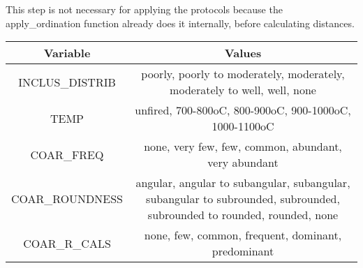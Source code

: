 \documentclass[12pt,]{book}
\begin{document}
This step is not necessary for applying the protocols because the apply\_ordination function already does it internally, before calculating distances.

\begin{longtable}[]{@{}cc@{}}
\toprule
\begin{minipage}[b]{0.22\columnwidth}\centering
Variable\strut
\end{minipage} & \begin{minipage}[b]{0.43\columnwidth}\centering
Values\strut
\end{minipage}\tabularnewline
\midrule
\endhead
\begin{minipage}[t]{0.22\columnwidth}\centering
INCLUS\_DISTRIB\strut
\end{minipage} & \begin{minipage}[t]{0.43\columnwidth}\centering
poorly, poorly to moderately,
moderately, moderately to
well, well, none\strut
\end{minipage}\tabularnewline
\begin{minipage}[t]{0.22\columnwidth}\centering
TEMP\strut
\end{minipage} & \begin{minipage}[t]{0.43\columnwidth}\centering
unfired, 700-800oC, 800-900oC,
900-1000oC, 1000-1100oC\strut
\end{minipage}\tabularnewline
\begin{minipage}[t]{0.22\columnwidth}\centering
COAR\_FREQ\strut
\end{minipage} & \begin{minipage}[t]{0.43\columnwidth}\centering
none, very few, few, common,
abundant, very abundant\strut
\end{minipage}\tabularnewline
\begin{minipage}[t]{0.22\columnwidth}\centering
COAR\_ROUNDNESS\strut
\end{minipage} & \begin{minipage}[t]{0.43\columnwidth}\centering
angular, angular to
subangular, subangular,
subangular to subrounded,
subrounded, subrounded to
rounded, rounded, none\strut
\end{minipage}\tabularnewline
\begin{minipage}[t]{0.22\columnwidth}\centering
COAR\_R\_CALS\strut
\end{minipage} & \begin{minipage}[t]{0.43\columnwidth}\centering
none, few, common, frequent,
dominant, predominant\strut
\end{minipage}\tabularnewline

\end{longtable}
\end{document}
